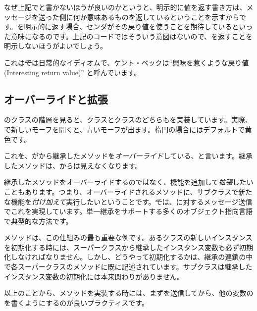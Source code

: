\documentclass[a4paper,10pt,twoside]{book}
\begin{document}
なぜ上記でと書かないほうが良いのかというと、明示的に値を返す書き方は、メッセージを送った側に何か意味あるものを返しているということを示すからです。\self を明示的に返す場合、センダがその戻り値を使うことを期待しているといった意味になるのです。上記のコードではそういう意図はないので、\self を返すことを明示しないほうがよいでしょう。

これは\st では日常的なイディオムで、ケント・ベックは``興味を惹くような戻り値(Interesting return value)'' \cite{Beck97a} と呼んでいます。


\subsection{オーバーライドと拡張}

のクラスの階層を見ると、クラスと\mbox{}クラスのどちらもを実装しています。実際、で新しいモーフを開くと、青いモーフが出ます。楕円の場合にはデフォルトで黄色です。

これを、がから継承したメソッドを\emph{オーバーライド}している、と言います。継承したメソッドは、からは見えなくなります。

継承したメソッドをオーバーライドするのではなく、機能を追加して\emph{拡張}したいこともあります。つまり、オーバーライドされるメソッドに、サブクラスで新たな機能を\emph{付け加えて}実行したいということです。\st では、\super に対するメッセージ送信でこれを実現しています。単一継承をサポートする多くのオブジェクト指向言語で典型的な方法です。

メソッドは、この仕組みの最も重要な例です。あるクラスの新しいインスタンスを初期化する時には、スーパークラスから継承したインスタンス変数も必ず初期化しなければなりません。しかし、どうやって初期化するかは、継承の連鎖の中で各スーパークラスのメソッドに既に記述されています。サブクラスは継承したインスタンス変数の初期化には本来関わりがありません。

以上のことから、メソッドを実装する時には、まずを送信してから、他の変数のを書くようにするのが良いプラクティスです。
\end{document}
